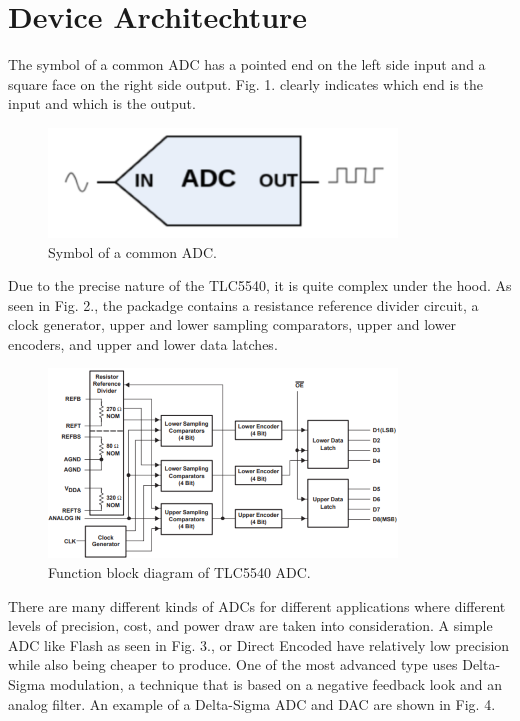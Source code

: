 \documentclass[conference]{IEEEtran}
\begin{document}
\section{Device Architechture}

The symbol of a common ADC has a pointed end on the left side input and a square face on the right side output. Fig. 1. clearly indicates which end is the input and which is the output.

\begin{figure}[htbp]
\centerline{\includegraphics{ADCsym.png}}
\caption{Symbol of a common ADC.}
\end{figure}

Due to the precise nature of the TLC5540, it is quite complex under the hood. As seen in Fig. 2., the packadge contains a resistance reference divider circuit, a clock generator, upper and lower sampling comparators, upper and lower encoders, and upper and lower data latches.

\begin{figure}[htbp]
\centerline{\includegraphics{ADCblkTI.png}}
\caption{Function block diagram of TLC5540 ADC.}
\end{figure}

There are many different kinds of ADCs for different applications where different levels of precision, cost, and power draw are taken into consideration. A simple ADC like Flash as seen in Fig. 3., or Direct Encoded have relatively low precision while also being cheaper to produce. One of the most advanced type uses Delta-Sigma modulation, a technique that is based on a negative feedback look and an analog filter. An example of a Delta-Sigma ADC and DAC are shown in Fig. 4.
\end{document}
